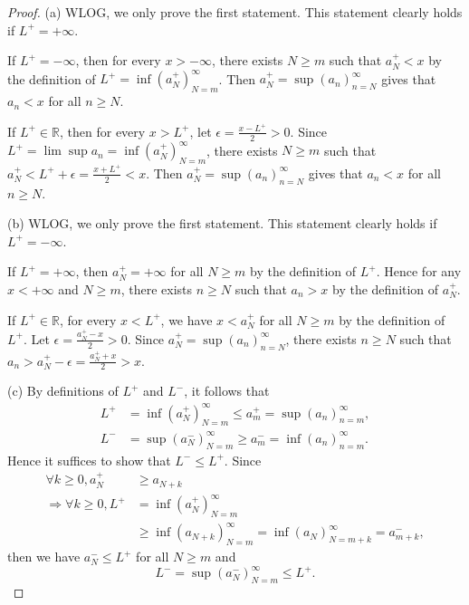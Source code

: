 \begin{proof}
  (a) WLOG, we only prove the first statement.
  This statement clearly holds if $L^{+}=+\infty$.
  
  If $L^{+}=-\infty$, then for every $x>-\infty$, 
  there exists $N\ge m$ such that  $a_{N}^{+}<x$
  by the definition of $L^{+}=\inf(a_{N}^{+})_{N=m}^{\infty}$.
  Then $a_{N}^{+}=\sup(a_{n})_{n=N}^{\infty}$ gives that
  $a_{n}<x$ for all $n\ge N$. 
  
  If $L^{+}\in \mathbb{R}$,
  then for every $x>L^{+}$, let $\epsilon=\frac{x-L^{+}}{2}>0$.
  Since $L^{+}=\lim \sup a_{n}=\inf(a_{N}^{+})_{N=m}^{\infty}$,
  there exists $N\ge m$ such that
  $a_{N}^{+}<L^{+}+\epsilon=\frac{x+L^{+}}{2}<x$.
  Then $a_{N}^{+}=\sup(a_{n})_{n=N}^{\infty}$ gives that
  $a_{n}<x$ for all $n\ge N$.

  (b) WLOG, we only prove the first statement.
  This statement clearly holds if $L^{+}=-\infty$.
  
  If $L^{+}=+\infty$, then $a_{N}^{+}=+\infty$ for all $N\ge m$
  by the definition of $L^{+}$.
  Hence for any $x<+\infty$ and $N\ge m$,
  there exists $n\ge N$ such that
  $a_{n}>x$ by the definition of $a_{N}^{+}$.
  
  If $L^{+}\in \mathbb{R}$,
  for every $x<L^{+}$, we have $x<a_{N}^{+}$ for all $N\ge m$
  by the definition of $L^{+}$.
  Let $\epsilon=\frac{a_{N}^{+}-x}{2}>0$.
  Since $a_{N}^{+}=\sup(a_{n})_{n=N}^{\infty}$,
  there exists $n\ge N$ such that
  $a_{n}>a_{N}^{+}-\epsilon=\frac{a_{N}^{+}+x}{2}>x$.

  (c) By definitions of $L^{+}$ and $L^{-}$, it follows that
  \begin{align*}
    L^{+}&=\inf(a_{N}^{+})_{N=m}^{\infty}\le a_{m}^{+}
           =\sup(a_{n})_{n=m}^{\infty},\\
    L^{-}&=\sup(a_{N}^{-})_{N=m}^{\infty}\ge a_{m}^{-}
           =\inf(a_{n})_{n=m}^{\infty}.
  \end{align*}
  Hence it suffices to show that $L^{-}\le L^{+}$.
  Since
  \begin{align*}
    \forall k\ge 0, a_{N}^{+}&\ge a_{N+k}\\
    \Rightarrow
    \forall k\ge 0, L^{+}&=\inf(a_{N}^{+})_{N=m}^{\infty}\\
      &\ge \inf(a_{N+k})_{N=m}^{\infty}
         = \inf(a_{N})_{N=m+k}^{\infty} = a_{m+k}^{-},
  \end{align*}
  then we have $a_{N}^{-} \le L^{+}$ for all $N\ge m$ and
  \begin{displaymath}
    L^{-}=\sup(a_{N}^{-})_{N=m}^{\infty}\le L^{+}.
  \end{displaymath}


\end{proof}
